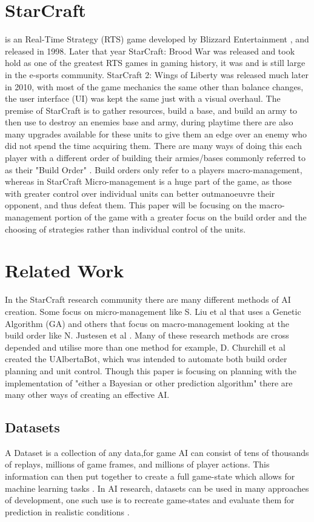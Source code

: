 \documentclass[journal]{IEEEtran}
\begin{document}
\section{StarCraft}
 is an Real-Time Strategy (RTS) game developed by Blizzard Entertainment \cite{Blizzard}, and released in 1998. Later that year StarCraft: Brood War was released and took hold as one of the greatest RTS games in gaming history, it was and is still large in the e-sports community. StarCraft 2: Wings of Liberty was released much later in 2010, with most of the game mechanics the same other than balance changes, the user interface (UI) was kept the same just with a visual overhaul. The premise of StarCraft is to gather resources, build a base, and build an army to then use to destroy an enemies base and army, during playtime there are also many upgrades available for these units to give them an edge over an enemy who did not spend the time acquiring them. There are many ways of doing this each player with a different order of building their armies/bases commonly referred to as their "Build Order" \cite{BuildOrder}. Build orders only refer to a players macro-management, whereas in StarCraft Micro-management is a huge part of the game, as those with greater control over individual units can better outmanoeuvre their opponent, and thus defeat them. This paper will be focusing on the macro-management portion of the game with a greater focus on the build order and the choosing of strategies rather than individual control of the units.

\section{Related Work}
In the StarCraft research community there are many different methods of AI creation. Some focus on micro-management like S. Liu et al \cite{EffectiveMicro} that uses a Genetic Algorithm (GA) and others that focus on macro-management looking at the build order like N. Justesen et al \cite{OnlineEvo}. Many of these research methods are cross depended and utilise more than one method for example, D. Churchill et al \cite{Agents} created the UAlbertaBot, which was intended to automate both build order planning and unit control. Though this paper is focusing on planning with the implementation of "either a Bayesian or other prediction algorithm" there are many other ways of creating an effective AI.

\subsection{Datasets}
A Dataset is a collection of any data,for game AI can consist of tens of thousands of replays, millions of game frames, and millions of player actions. This information can then put together to create a full game-state which allows for machine learning tasks \cite{Dataset17}. In AI research, datasets can be used in many approaches of development, one such use is to recreate game-states and evaluate them for prediction in realistic conditions \cite{SpecialTactics}.
\cite{Dataset}
\end{document}
